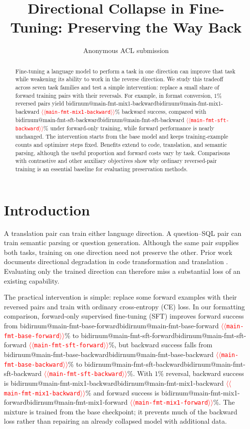 \documentclass[11pt]{article}
\title{Directional Collapse in Fine-Tuning: Preserving the Way Back}
\author{
  Anonymous ACL submission \\
}
\makeatletter
\providecommand{\NUM}[1]{%
  \ifcsname bidirnum@#1\endcsname\csname bidirnum@#1\endcsname
  \else\textcolor{red}{$\langle\langle$\texttt{#1}$\rangle\rangle$}\fi}
\makeatother
\begin{document}
\maketitle

\begin{abstract}
Fine-tuning a language model to perform a task in one direction can improve that task
while weakening its ability to work in the reverse direction. We study this tradeoff
across seven task families and test a simple intervention: replace a small share of forward
training pairs with their reversals. For example, in format conversion, $1\%$ reversed
pairs yield \NUM{main-fmt-mix1-backward}\% backward success, compared with
\NUM{main-fmt-sft-backward}\% under forward-only training, while forward performance
is nearly unchanged. The intervention starts from the base model and keeps training-example
counts and optimizer steps fixed. Benefits extend to code, translation, and semantic parsing,
although the useful proportion and forward costs vary by task. Comparisons with contrastive
and other auxiliary objectives show why ordinary reversed-pair training is an essential
baseline for evaluating preservation methods.
\end{abstract}

\section{Introduction}
\label{sec:intro}

A translation pair can train either language direction. A question--SQL pair can train
semantic parsing or question generation. Although the same pair supplies both tasks,
training on one direction need not preserve the other. Prior work documents directional
degradation in code transformation \citep{nikiema2025contrastive} and translation
\citep{zhu2024finetuning}. Evaluating only the trained direction can therefore miss a
substantial loss of an existing capability.

The practical intervention is simple: replace some forward examples with their reversed
pairs and train with ordinary cross-entropy (CE) loss. In our formatting comparison,
forward-only supervised fine-tuning (SFT) improves forward success from \NUM{main-fmt-base-forward}\% to
\NUM{main-fmt-sft-forward}\%, but backward success falls from
\NUM{main-fmt-base-backward}\% to \NUM{main-fmt-sft-backward}\%.
With $1\%$ reversal, backward success is \NUM{main-fmt-mix1-backward}\% and forward
success is \NUM{main-fmt-mix1-forward}\%. The mixture is trained from the base checkpoint;
it prevents much of the backward loss rather than repairing an already collapsed model
with additional data.
\end{document}
